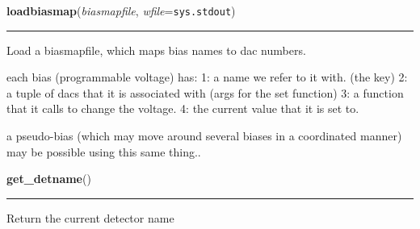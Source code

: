     \label{det:loadbiasmap}

    \vspace{0.5ex}

    \begin{boxedminipage}{\textwidth}

    \raggedright \textbf{loadbiasmap}(\textit{biasmapfile}, \textit{wfile}=\texttt{sys.stdout})

    \vspace{-1.5ex}

    \rule{\textwidth}{0.5\fboxrule}
    Load a biasmapfile, which maps bias names to dac numbers.

    each bias (programmable voltage) has: 1: a name we refer to it with. 
    (the key) 2: a tuple of dacs that it is associated with (args for the 
    set function) 3: a function that it calls to change the voltage. 4: the
    current value that it is set to.

    a pseudo-bias (which may move around several biases in a coordinated 
    manner) may be possible using this same thing..

    \vspace{1ex}

    \end{boxedminipage}

    \label{det:get_detname}

    \vspace{0.5ex}

    \begin{boxedminipage}{\textwidth}

    \raggedright \textbf{get\_detname}()

    \vspace{-1.5ex}

    \rule{\textwidth}{0.5\fboxrule}
    Return the current detector name

    \vspace{1ex}

    \end{boxedminipage}

    \label{det:savedet}

    \vspace{0.5ex}

